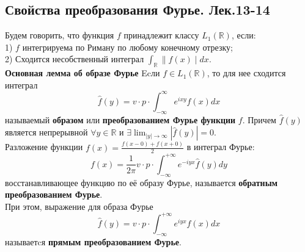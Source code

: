 \documentclass{article}
\begin{document}
\subsection{Свойства преобразования Фурье. Лек.13-14}
	Будем говорить, что функция $ f $ принадлежит классу $L_{1}(\mathbb{R})$, если:\\
	1) $ f $ интегрируема по Риману по любому конечному отрезку;\\
	2) Сходится несобственный интеграл $\int_{\mathbb{R}} \| f(x) \mid d x$.\\
	\textbf{Основная лемма об образе Фурье} Ecли $ f \in L_{1}(\mathbb{R})$, то для нее сходится интеграл
	\begin{equation}
		\widehat{f}(y)=v \cdot p \cdot \int_{-\infty}^{\infty} e^{i x y} f(x) d x
	\end{equation}
	называемый \textbf{образом} или \textbf{преобразованием Фурье функции} $ f $. Причем $ \widehat{f}(y) $ является непрерывной $ \forall y \in \mathbb{R} $ и $ \exists \lim _{|y| \rightarrow \infty}|\widehat{f}(y)|=0$.\\ 
	Разложение функции $ f(x)=\frac{f(x-0)+f(x+0)}{2} $ в интеграл Фурье:
	\begin{equation}
	f(x)=\frac{1}{2 \pi} v \cdot p \cdot \int_{-\infty}^{+\infty} e^{-i y x} \hat{f}(y) d y
	\end{equation}
	восстанавливающее функцию по её образу Фурье, называется \textbf{обратным преобразованием Фурье}.\\
	При этом, выражение для образа Фурье
	\begin{equation}
	\widehat{f}(y)=v \cdot p \cdot \int_{-\infty}^{+\infty} e^{i y x} f(x) d x
	\end{equation}
	называетcя \textbf{прямым преобразованием Фурье}.
\end{document}
